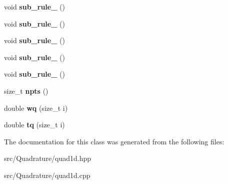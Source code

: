 \begin{DoxyCompactItemize}
void {\bfseries sub\+\_\+rule\+\_} ()
\item 
\mbox{\label{classHArDCore2D_1_1LegendreGauss_a50b4238c7cade3272efe46641e1d2d3f}} 
void {\bfseries sub\+\_\+rule\+\_} ()
\item 
\mbox{\label{classHArDCore2D_1_1LegendreGauss_ae6a8077dd8cf9fc76ed1234b93691049}} 
void {\bfseries sub\+\_\+rule\+\_} ()
\item 
\mbox{\label{classHArDCore2D_1_1LegendreGauss_aad37934da18110fd078f1950a575fd3d}} 
void {\bfseries sub\+\_\+rule\+\_} ()
\item 
\mbox{\label{classHArDCore2D_1_1LegendreGauss_a6b7095506bd1d218c28f5778c6dea545}} 
void {\bfseries sub\+\_\+rule\+\_} ()
\item 
\mbox{\label{classHArDCore2D_1_1LegendreGauss_a1251635135ab00a28e128a058288e440}} 
size\+\_\+t {\bfseries npts} ()
\item 
\mbox{\label{classHArDCore2D_1_1LegendreGauss_a2800eb7a7c2648b1edb77231ef42608a}} 
double {\bfseries wq} (size\+\_\+t i)
\item 
\mbox{\label{classHArDCore2D_1_1LegendreGauss_aa10e032f4ea04323773b23177b4124ee}} 
double {\bfseries tq} (size\+\_\+t i)
\end{DoxyCompactItemize}


The documentation for this class was generated from the following files\+:\begin{DoxyCompactItemize}
\item 
src/\+Quadrature/quad1d.\+hpp\item 
src/\+Quadrature/quad1d.\+cpp\end{DoxyCompactItemize}

